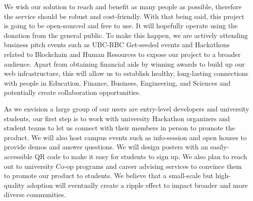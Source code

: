 \documentclass[12pt]{article}
\renewcommand{\_}{\kern-1.5pt\textunderscore\kern-1.5pt}
\begin{document}
We wish our solution to reach and benefit as many people as possible, therefore the service should be robust and
cost-friendly. With that being said, this project is going to be open-sourced and free to use. It will hopefully
operate using the donation from the general public. To make this happen, we are actively attending business pitch
events such as UBC-RBC Get-seeded events and Hackathons related to Blockchain and Human Resources to expose our
project to a broader audience. Apart from obtaining financial aids by winning awards to build up our web
infrastructure, this will allow us to establish healthy, long-lasting connections with people in Education,
Finance, Business, Engineering, and Sciences and potentially create collaboration opportunities.

As we envision a large group of our users are entry-level developers and university students, our first step is
to work with university Hackathon organizers and student teams to let us connect with their members in person to
promote the product. We will also host campus events such as info-session and open houses to provide demos and
answer questions. We will design posters with an easily-accessible QR code to make it easy for students to sign up.
We also plan to reach out to university Co-op programs and career advising services to convince them to promote
our product to students. We believe that a small-scale but high-quality adoption will eventually create a ripple
effect to impact broader and more diverse communities.

\newpage


\begingroup
\raggedright

{}

\nocite{*}

\endgroup

\newpage
\end{document}
